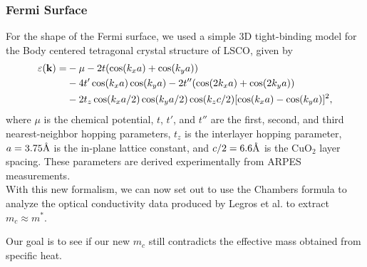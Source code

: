 \subsubsection{Fermi Surface}
For the shape of the Fermi surface, we used a simple 3D tight-binding model for the Body centered
tetragonal crystal structure of LSCO, given by
\begin{equation}
\begin{aligned}
    \varepsilon(\vb{k}) = &-\mu - 2t(\cos(k_x a) + \cos(k_y a)) \\
        &- 4t'\cos(k_x a)\cos(k_y a) - 2t''(\cos(2k_x a) + \cos(2k_y a)) \\
        &- 2t_z\cos(k_x a / 2)\cos(k_y a / 2)\cos(k_z c / 2)[\cos(k_x a) - \cos(k_y a)]^2,
\end{aligned}
\end{equation}
where $\mu$ is the chemical potential, $t$, $t'$, and $t''$ are the first, second, and third
nearest-neighbor hopping parameters, $t_z$ is the interlayer hopping parameter,
$a=3.75\textup{\AA}$ is the in-plane lattice constant, and $c/2=6.6\textup{\AA}$ is the
$\mathrm{CuO_2}$ layer spacing. These parameters are derived experimentally from ARPES measurements\cite{horio2018}. \\

With this new formalism, we can now set out to use the Chambers formula to analyze the optical conductivity data produced by Legros et al.\cite{legros2022} to extract $m_c \approx m^*$.

Our goal is to see if our new $m_c$ still contradicts the effective mass obtained from specific heat. 
